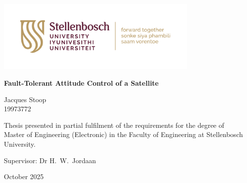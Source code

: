 \graphicspath{{frontmatter/fig/}}

\begin{titlepage}
	\begin{center}
		
		\includegraphics[width=10cm]{SU_corporate_horizontal_with_slogan_RGB}
				
		\vfill
		
		{\sffamily \bfseries \huge Fault-Tolerant Attitude Control of a Satellite \par}
		
		\vfill
		
		{\large {\Large Jacques Stoop} \\ 19973772 \par}
		
		\vfill
		
		\vfill
		
		
		{\large Thesis presented in partial fulfilment of the requirements for the degree of \\ Master of Engineering (Electronic) in the Faculty of Engineering at Stellenbosch University. \par}
		
		
		
		\vfill
		
		{\large {Supervisor}: Dr H.\ W.\ Jordaan}
		
		\vfill
		
		{\Large October 2025}
	\end{center}
\end{titlepage}
